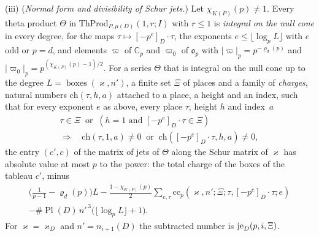 \documentclass[11pt,a4paper]{article}
\theoremstyle{plainx}
\theoremstyle{uprightx}
\newcommand{\CC}{\mathbb{C}}
\newcommand{\op}{\mathfrak{o}_{p}}                         %
\newcommand{\KP}[1]{K(#1)}
\newcommand{\chiK}[1]{\chi_{\KP{#1}}}
\newcommand{\Dmu}[1]{\mu(#1)}
\newcommand{\PlD}[1]{\operatorname{Pl}(#1)}
\newcommand{\pin}[2]{[#2]_{#1}}
\newcommand{\nD}[2]{n_{#2}(#1)}
\newcommand{\cc}[7]{\mathrm{cc}_{#1}(#2,#3;#4;#5,#6;#7)}
\newcommand{\kapD}[1]{\varkappa_{#1}}
\newcommand{\nsw}[2]{\varrho_{#1}(#2)}
\newcommand{\ThProd}[5]{\mathrm{ThProd}_{#1,#2}(#3,#4;#5)}
\newcommand{\boxes}[2]{\operatorname{boxes}(#1,#2)}
\begin{document}
{\textup{(iii)} (\emph{Normal form and divisibility of Schur jets.}) Let $\chiK{P}(p)\ne1$. Every theta product
$\Theta$ in $\ThProd{P}{\Dmu{D}}{1}{r}{I}$ with $r\le1$ is \emph{integral on the null cone} in every degree,
for the maps $\tau\mapsto\pin{D}{-p^{e}}\cdot\tau$, the exponents $e\le\lfloor\log_pL\rfloor$ with $e$ odd or
$p=d$, and elements $\varpi$ of $\CC_p$ and $\varpi_0$ of $\op$ with $|\varpi|_p=p^{-\nsw{d}{p}}$ and
$|\varpi_0|_p=p^{(\chiK{P}(p)-1)/2}$. For a series $\Theta$ that is integral on the null cone up to the degree
$L=\boxes{\varkappa}{n'}$, a finite set $\Xi$ of places and a family of \emph{charges}, natural numbers
$\mathrm{ch}(\tau,h,a)$ attached to a place, a height and an index, such that for every exponent $e$ as above,
every place $\tau$, height $h$ and index~$a$
\begin{multline}\label{e:charge}
\tau\in\Xi\ \text{ or }\ (h=1\text{ and }\pin{D}{-p^{e}}\cdot\tau\in\Xi)\\
\Longrightarrow\quad\mathrm{ch}(\tau,1,a)\ne0\ \text{ or }\ \mathrm{ch}(\pin{D}{-p^{e}}\cdot\tau,h,a)\ne0,
\end{multline}
the entry $(c',c)$ of the matrix of jets of $\Theta$ along the Schur matrix of $\varkappa$ has absolute value
at most $p$ to the power: the total charge of the boxes of the tableau $c'$, minus
\begin{multline*}
\bigl(\tfrac1{p-1}-\nsw{d}{p}\bigr)L-\tfrac{1-\chiK{P}(p)}{2}\sum_{e,\tau}\cc{p}{\varkappa}{n'}{\Xi}{\tau}{\pin{D}{-p^{e}}\cdot\tau}{e}\\
-\#\PlD{D}\,n'^{\,3}\bigl(\lfloor\log_pL\rfloor+1\bigr).
\end{multline*}
For $\varkappa=\kapD{D}$ and $n'=\nD{D}{i+1}$ the subtracted number is $\mathrm{je}_{D}(p,i,\Xi)$.}
\end{document}
